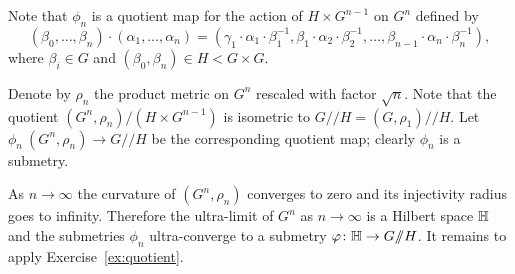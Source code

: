 Note that $\phi_n$ is a quotient map for the action of $H\times G^{n-1}$ on $G^n$ defined by
\[(\beta_0,\dots,\beta_n)\cdot(\alpha_1,\dots,\alpha_n)=(\gamma_1\cdot \alpha_1\cdot\beta_1^{-1},\beta_1\cdot\alpha_2\cdot\beta_2^{-1},\dots,\beta_{n-1}\cdot\alpha_n\cdot\beta_n^{-1}),\]
where $\beta_i\in G$ and $(\beta_0,\beta_n)\in H<G\times G$. 

Denote by $\rho_n$ the product metric on $G^n$ rescaled with factor $\sqrt{n}$.
Note that the quotient $(G^n,\rho_n)/(H\times G^{n-1})$ is isometric to $G/\!\!/H=(G,\rho_1)/\!\!/H$.
Let $\phi_n\:(G^n,\rho_n)\to G/\!\!/H$ be the corresponding quotient map; 
clearly $\phi_n$ is a submetry. 

As $n\to\infty$ the curvature of $(G^n,\rho_n)$ converges to zero and its injectivity radius goes to infinity.
Therefore the ultra-limit of $G^n$ as $n\to\infty$ is a Hilbert space $\mathbb{H}$ and the submetries $\phi_n$ ultra-converge to a submetry $\varphi\colon\mathbb{H}\to G/\!\!/H$.
It remains to apply Exercise~\ref{ex:quotient}.
\qeds
